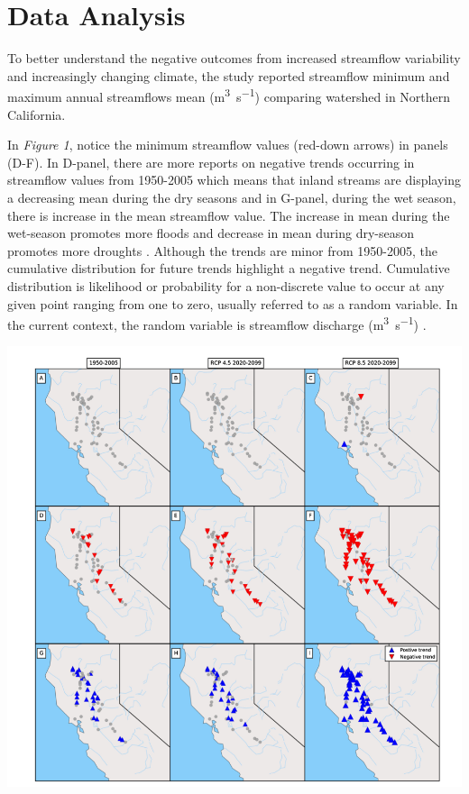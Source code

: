 \documentclass[a4paper,man,biblatex]{apa7}
\begin{document}
\section{Data Analysis}  
\par To better understand the negative outcomes from increased streamflow variability and increasingly changing climate, the \textcite{mallakpour_2018} study reported streamflow minimum and maximum annual streamflows mean (\si{\cubic\meter\per\second}) comparing watershed in Northern California.\\ 
\par In \textit{Figure 1}, notice the minimum streamflow values (red-down arrows) in panels (D-F). In D-panel, there are more reports on negative trends occurring in streamflow values from 1950-2005 which means that inland streams are displaying a decreasing mean during the dry seasons and in G-panel, during the wet season, there is increase in the mean streamflow value. The increase in mean during the wet-season promotes more floods and decrease in mean during dry-season promotes more droughts \autocite{mallakpour_2018}. Although the trends are minor from 1950-2005, the cumulative distribution for future trends highlight a negative trend. Cumulative distribution is likelihood or probability for a non-discrete value to occur at any given point ranging from one to zero, usually referred to as a random variable. In the current context, the random variable is streamflow discharge (\si{\cubic\meter\per\second}) \autocite{cdf_def}.\\
 \begin{minipage}{0.65\linewidth}   
     \includegraphics[scale=0.35]{stream_flow_cali.png}
     \label{fig:streamflow_trend}
\end{minipage}
\end{document}

